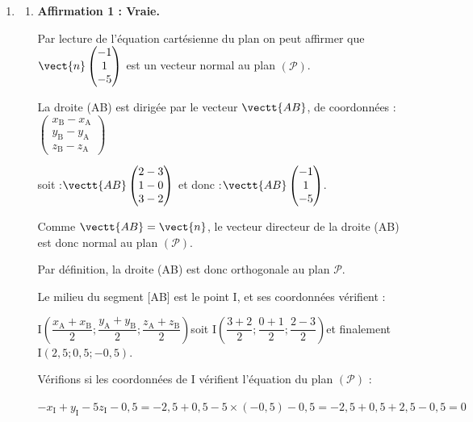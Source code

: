 \begin{enumerate}
		\item \begin{enumerate}
			\item \textbf{Affirmation 1 : Vraie.}

			Par lecture de l'équation cartésienne du plan on peut affirmer que $\vect{n}\begin{pmatrix}-1\\1\\-5\end{pmatrix}$ est un vecteur normal au plan $(\mathcal{P})$.

			La droite (AB) est dirigée par le vecteur $\vectt{AB}$, de coordonnées : \quad $\begin{pmatrix} x_{\mathrm{B}} - x_{\mathrm{A}} \\ y_{\mathrm{B}} - y_{\mathrm{A}} \\ z_{\mathrm{B}} - z_{\mathrm{A}} \end{pmatrix} $

			soit :\quad $\vectt{AB} \begin{pmatrix} 2 - 3\\1-0\\3-2 \end{pmatrix} $ \quad et donc :\quad $\vectt{AB} \begin{pmatrix} -1\\1\\-5 \end{pmatrix} $.

			Comme $\vectt{AB} = \vect{n}$, le vecteur directeur de la droite (AB) est donc normal au plan $(\mathcal{P})$.

			Par définition, la droite (AB) est donc orthogonale au plan $\mathcal{P}$.

			Le milieu du segment [AB] est le point I, et ses coordonnées vérifient :

			$\mathrm{I}\left(\dfrac{x_{\mathrm{A}} + x_{\mathrm{B}}}{2} ; \dfrac{y_{\mathrm{A}} + y_{\mathrm{B}}}{2} ; \dfrac{z_{\mathrm{A}} + z_{\mathrm{B}}}{2}\right) $\quad soit \quad $\mathrm{I} \left(\dfrac{3+2}{2} ; \dfrac{0+1}{2} ; \dfrac{2-3}{2}\right) $\quad et finalement \quad $\mathrm{I}(2,5 ; 0,5 ; -0,5)$.

			Vérifions si les coordonnées de I vérifient l'équation du plan $(\mathcal{P})$ :

			$-x_{\mathrm{I}}+y_{\mathrm{I}}-5 z_{\mathrm{I}}-0,5= -2,5 +  0,5 -5 \times (-0,5) - 0,5 = -2,5 +0,5 + 2,5 - 0,5 = 0$


\end{enumerate}
\end{enumerate}

